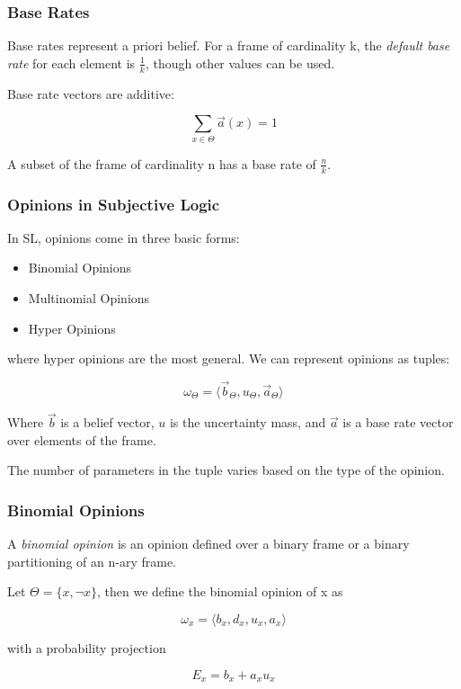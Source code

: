 \documentclass{beamer}
\begin{document}

\begin{frame}
\frametitle{Base Rates}

Base rates represent a priori belief. For a frame of cardinality k, the
\emph{default base rate} for each element is $\frac{1}{k}$, though other values
can be used.

Base rate vectors are additive:

$$
\sum_{x \in \Theta} \vec{a}\left(x\right) = 1
$$

A subset of the frame of cardinality n has a base rate of $\frac{n}{k}$.

\end{frame}


\begin{frame}
\frametitle{Opinions in Subjective Logic}

In SL, opinions come in three basic forms:

\begin{itemize}
  \item Binomial Opinions
  \item Multinomial Opinions
  \item Hyper Opinions
\end{itemize}

where hyper opinions are the most general. We can represent opinions as tuples:

$$
\omega_\Theta = \langle \vec{b}_\Theta, u_\Theta, \vec{a}_\Theta \rangle
$$

Where $\vec{b}$ is a belief vector,
$u$ is the uncertainty mass, and
$\vec{a}$ is a base rate vector over elements of the frame.

The number of parameters in the tuple varies based on the type of the opinion.

\end{frame}



\begin{frame}
\frametitle{Binomial Opinions}

A \emph{binomial opinion} is an opinion defined over a binary frame or a binary partitioning of an n-ary frame.

Let $\Theta = \lbrace x, \lnot x \rbrace$, then we define the binomial opinion of
x as

$$
\omega_x = \langle b_x, d_x, u_x, a_x \rangle
$$

with a probability projection

$$
E_x = b_x + a_x u_x
$$

\end{frame}
\end{document}
